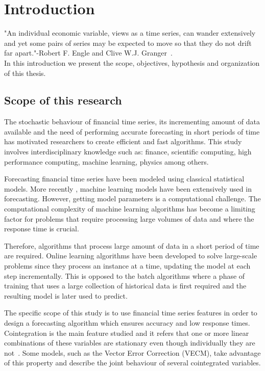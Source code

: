 \chapter{Introduction}\label{ch:introduction}

\vspace{0.5cm} 

"An individual economic variable, views as a time series, can wander extensively
and yet some pairs of series may be expected to move so that they do not drift
far apart."-Robert F. Engle and Clive W.J. Granger~\cite{engle1987}.\\
In this introduction we present the scope, objectives, hypothesis and
organization of this thesis.


\section{Scope of this research}

The stochastic behaviour of financial time series, its incrementing
amount of data available and the need of performing accurate forecasting in
short periods of time has motivated researchers to create efficient and fast
algorithms. This study involves interdisciplinary knowledge such as: finance,
scientific computing, high performance computing, machine learning, physics
among others.

Forecasting financial time series have been modeled using classical statistical
models. More recently , machine learning models have been extensively used in
forecasting. However, getting model parameters is a computational challenge.
The computational complexity of machine learning algorithms has become a
limiting factor for problems that require processing large volumes of data and
where the response time is crucial.

Therefore, algorithms that process large amount of data in a short period of
time are required.  Online learning algorithms have been developed to solve
large-scale problems since they process an instance at a time, updating the
model at each step incrementally. This is opposed to the batch algorithms where
a phase of training that uses a large collection of historical data is first
required and the resulting model is later used to predict.  

The specific scope of this study is to use financial time series features in
order to design a forecasting algorithm which ensures accuracy and low response
times. Cointegration is the main feature studied and it refers that one or more
linear combinations of these variables are stationary even though individually
they are not~\cite{engle87}.  Some models, such as the Vector Error Correction
(VECM), take advantage of this property and describe the joint behaviour of
several cointegrated variables.

